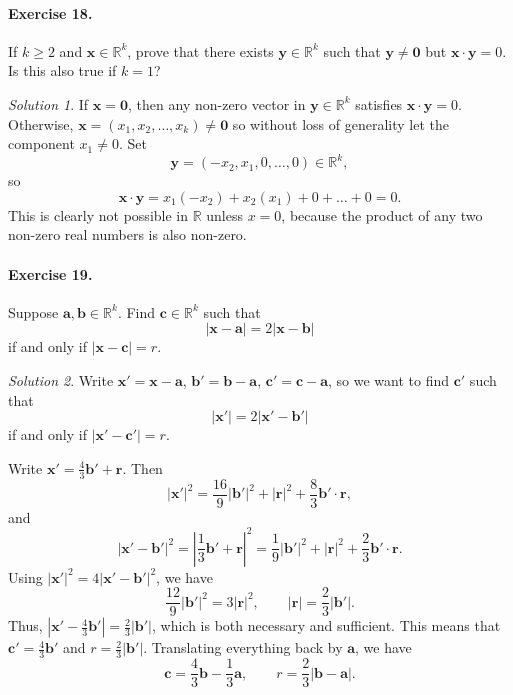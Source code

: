 \documentclass[11pt]{report}
\def\R{\mathbb{R}}
\renewcommand\vec\boldsymbol
\def\vx{\vec{x}}
\def\vy{\vec{y}}
\def\va{\vec{a}}
\def\vb{\vec{b}}
\def\vc{\vec{c}}
\def\vr{\vec{r}}
\theoremstyle{remark}
\newtheorem*{solution}{Solution}
\begin{document}
    \paragraph{Exercise 18.} If $k \geq 2$ and $\vx \in \R^k$, prove that there
    exists $\vy \in \R^k$ such that $\vy \neq \vec{0}$ but $\vx\cdot\vy = 0$.
    Is this also true if $k = 1$?
    \begin{solution}
        If $\vx = \vec{0}$, then any non-zero vector in $\vy \in \R^k$ satisfies
        $\vx\cdot\vy = 0$. Otherwise, $\vx = (x_1, x_2, \dots, x_k) \neq\vec{0}$ so
        without loss of generality let the component $x_1 \neq 0$. Set \[
            \vec{y} = (-x_2, x_1, 0, \dots, 0) \in \R^k,
        \] so \[
            \vx\cdot\vy = x_1(-x_2) + x_2(x_1) + 0 + \dots + 0 = 0.
        \] This is clearly not possible in $\R$ unless $x = 0$, because the product
        of any two non-zero real numbers is also non-zero.
    \end{solution}

    \paragraph{Exercise 19.} Suppose $\va, \vb \in \R^k$. Find $\vc \in
    \R^k$ such that \[
        |\vx - \va| = 2|\vx - \vb|
    \] if and only if $|\vx - \vc| = r$.
    \begin{solution}
        Write $\vx' = \vx - \va$, $\vb' = \vb - \va$, $\vc' = \vc - \va$, so we want
        to find $\vc'$ such that \[
            |\vx'| = 2|\vx' - \vb'|
        \] if and only if $|\vx' - \vc'| = r$.

        Write $\vx' = \frac{4}{3}\vb' + \vr$. Then \[
            |\vx'|^2 = \frac{16}{9}|\vb'|^2 + |\vr|^2 + \frac{8}{3}\vb'\cdot\vr,
        \] and \[
            |\vx' - \vb'|^2 = |\frac{1}{3}\vb' + \vr|^2 = \frac{1}{9}|\vb'|^2 +
            |\vr|^2 + \frac{2}{3}\vb'\cdot\vr.
        \] Using $|\vx'|^2 = 4|\vx' - \vb'|^2$, we have \[
            \frac{12}{9}|\vb'|^2 = 3|\vr|^2, \qquad |\vr| = \frac{2}{3}|\vb'|.
        \] Thus, $|\vx' - \frac{4}{3}\vb'| = \frac{2}{3}|\vb'|$, which is both
        necessary and sufficient. This means that  $\vc' = \frac{4}{3}\vb'$ and $r =
        \frac{2}{3}|\vb'|$. Translating everything back by $\va$, we have \[
            \vc = \frac{4}{3}\vb - \frac{1}{3}\va, \qquad r = \frac{2}{3}|\vb - \va|.
        \] 
    \end{solution}
\end{document}

